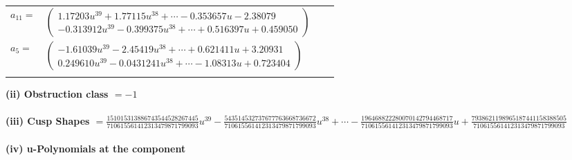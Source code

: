 \documentclass[1p]{elsarticle_modified}
\theoremstyle{definition}
\begin{document}
\begin{tabular}{m{7pt} m{180pt} m{7pt} m{180pt} }
\flushright $a_{11}=$&$\begin{pmatrix}1.17203 u^{39}+1.77115 u^{38}+\cdots-0.353657 u-2.38079\\-0.313912 u^{39}-0.399375 u^{38}+\cdots+0.516397 u+0.459050\end{pmatrix}$ \\
\flushright $a_{5}=$&$\begin{pmatrix}-1.61039 u^{39}-2.45419 u^{38}+\cdots+0.621411 u+3.20931\\0.249610 u^{39}-0.0431241 u^{38}+\cdots-1.08313 u+0.723404\end{pmatrix}$\\&\end{tabular}
\flushleft \textbf{(ii) Obstruction class $= -1$}\\~\\
\flushleft \textbf{(iii) Cusp Shapes $= \frac{151015313886743544528267445}{710615561412313479871799093} u^{39}-\frac{543514532737677763668736672}{710615561412313479871799093} u^{38}+\cdots-\frac{196468822280070142794468717}{710615561412313479871799093} u+\frac{7938621198965187441158388505}{710615561412313479871799093}$}\\~\\
\newpage\renewcommand{\arraystretch}{1}
\flushleft \textbf{(iv) u-Polynomials at the component}\newline \\
\end{document}
